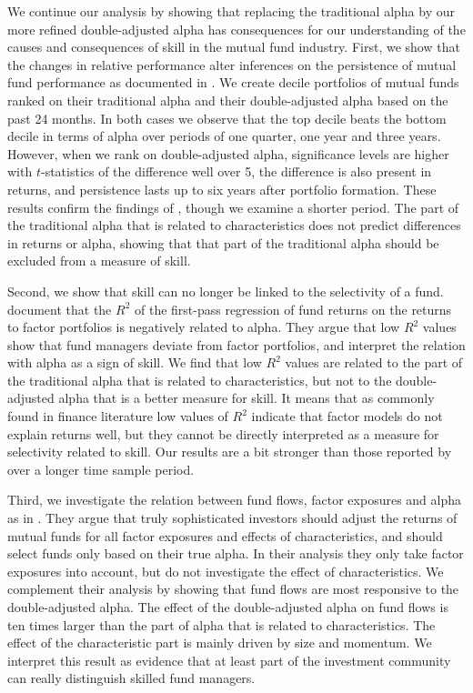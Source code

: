 We continue our analysis by showing that replacing the traditional alpha by our more refined double-adjusted alpha has consequences for our understanding of the causes and consequences of skill in the mutual fund industry. First, we show that the changes in relative performance alter inferences on the persistence of mutual fund performance as documented in \citet{carhart1997persistence,bollen2004short}. We create decile portfolios of mutual funds ranked on their traditional alpha and their double-adjusted alpha based on the past 24 months. In both cases we observe that the top decile beats the bottom decile in terms of alpha over periods of one quarter, one year and three years. However, when we rank on double-adjusted alpha, significance levels are higher with $t$-statistics of the difference well over 5, the difference is also present in returns, and persistence lasts up to six years after portfolio formation. These results confirm the findings of \citet{busse2017double}, though we examine a shorter period. The part of the traditional alpha that is related to characteristics does not predict differences in returns or alpha, showing that that part of the traditional alpha should be excluded from a measure of skill.

Second, we show that skill can no longer be linked to the selectivity of a fund. \citet{amihud2013mutual} document that the $R^2$ of the first-pass regression of fund returns on the returns to factor portfolios is negatively related to alpha. They argue that low $R^2$ values show that fund managers deviate from factor portfolios, and interpret the relation with alpha as a sign of skill. We find that low $R^2$ values are related to the part of the traditional alpha that is related to characteristics, but not to the double-adjusted alpha that is a better measure for skill. It means that as commonly found in finance literature low values of $R^2$ indicate that factor models do not explain returns well, but they cannot be directly interpreted as a measure for selectivity related to skill. Our results are a bit stronger than those reported by \citet{busse2017double} over a longer time sample period.

Third, we investigate the relation between fund flows, factor exposures and alpha as in \citet{barber2016factors}. They argue that truly sophisticated investors should adjust the returns of mutual funds for all factor exposures and effects of characteristics, and should select funds only based on their true alpha. In their analysis they only take factor exposures into account, but do not investigate the effect of characteristics. We complement their analysis by showing that fund flows are most responsive to the double-adjusted alpha. The effect of the double-adjusted alpha on fund flows is ten times larger than the part of alpha that is related to characteristics. The effect of the characteristic part is mainly driven by size and momentum. We interpret this result as evidence that at least part of the investment community can really distinguish skilled fund managers.

